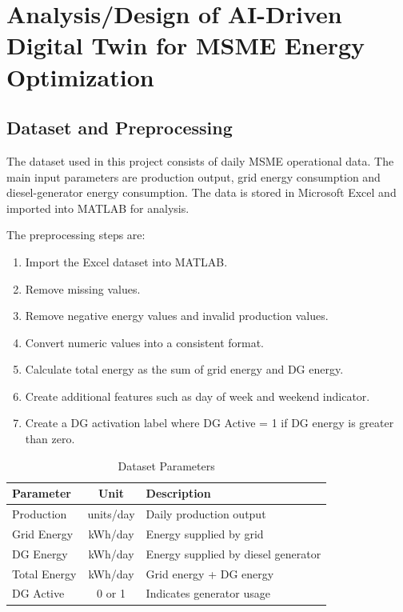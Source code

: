 \chapter{Analysis/Design of AI-Driven Digital Twin for MSME Energy Optimization}
\label{chap:design}

\section{Dataset and Preprocessing}
The dataset used in this project consists of daily MSME operational data. The main input parameters are production output, grid energy consumption and diesel-generator energy consumption. The data is stored in Microsoft Excel and imported into MATLAB for analysis.

The preprocessing steps are:
\begin{enumerate}
    \item Import the Excel dataset into MATLAB.
    \item Remove missing values.
    \item Remove negative energy values and invalid production values.
    \item Convert numeric values into a consistent format.
    \item Calculate total energy as the sum of grid energy and DG energy.
    \item Create additional features such as day of week and weekend indicator.
    \item Create a DG activation label where DG Active = 1 if DG energy is greater than zero.
\end{enumerate}

\begin{table}[htbp]
\centering
\caption{Dataset Parameters}
\label{tab:dataset_params}
\begin{tabular}{|l|c|p{6cm}|}
\hline
\textbf{Parameter} & \textbf{Unit} & \textbf{Description} \\
\hline
Production & units/day & Daily production output \\
Grid Energy & kWh/day & Energy supplied by grid \\
DG Energy & kWh/day & Energy supplied by diesel generator \\
Total Energy & kWh/day & Grid energy + DG energy \\
DG Active & 0 or 1 & Indicates generator usage \\
\hline
\end{tabular}
\end{table}

